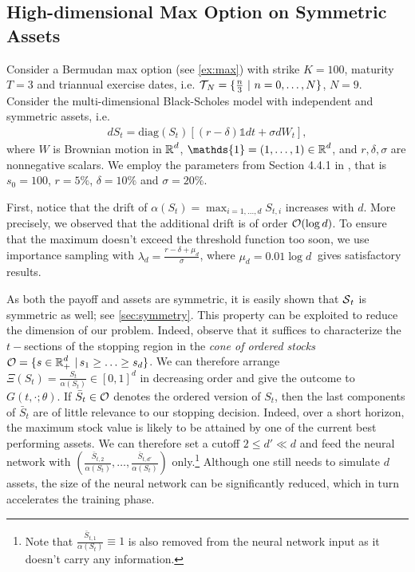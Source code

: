 \subsection{High-dimensional Max Option on Symmetric Assets}\label{sec:maxCallSym}
Consider a Bermudan max option (see \cref{ex:max}) %
with strike $K=100$, maturity $T=3$ and triannual exercise dates, i.e. $\operatorname{\mathcal{T}}_{\! N} = \{\frac{n}{3} \ | \ n=0,\ldots,N\}$, $N=9$.  Consider the multi-dimensional Black-Scholes model with independent and symmetric assets, i.e. 
\begin{align}\label{eq:multiBS}
    d S_t = \text{diag}(S_t) \left[ (r - \delta)\mathds{1} dt + \sigma dW_t\right],
\end{align}
where $W$ is Brownian motion in $\operatorname{\mathbb{R}}^d$, $\mathds{1} = (1,\ldots,1) \in \R^d$, and $r,\delta,\sigma$ are nonnegative scalars. 
We employ the parameters from Section 4.4.1 in \cite{Becker2}, that is $s_0 =100 $, $r=5\%$, $\delta =10\%$ and $\sigma = 20 \%$. 

 First, notice that the drift of $\alpha(S_t) = \max_{i=1,...,d}S_{t,i}$  increases with $d$. More precisely, we observed that the additional drift is of order $\operatorname{\mathcal{O}}(\log d)$. To ensure that the maximum doesn't exceed the threshold function too soon, we use importance sampling with $\lambda_d = \frac{r-\delta + \mu_d}{\sigma}$, where $\mu_d = 0.01 \log d\ $ gives satisfactory results. %

As both the payoff and assets are symmetric, it is easily shown that  $\operatorname{\mathcal{S}}_t$ is symmetric as well; see \cref{sec:symmetry}. This property can be exploited to reduce the dimension of our problem. Indeed, observe that it suffices to characterize the $t-$sections of the stopping region in the \textit{cone of ordered stocks}  
 $\operatorname{\mathcal{O}} = \{s\in \operatorname{\mathbb{R}}_+^d \,|\, s_1 \geq \ldots \geq s_d\}$. We can therefore arrange $\Xi(S_t) = \frac{S_t}{\alpha(S_t)}\in [0,1]^d$ in decreasing order and give the outcome to $G(t,\cdot; \theta)$. If $\bar{S}_t \in \operatorname{\mathcal{O}}$ denotes the ordered version of $S_t$, then the last components of $\bar{S}_t$ are of little relevance to our stopping decision. 
 Indeed, over a short horizon, the maximum stock value is likely to be attained by one of the current best performing assets. %
 We can therefore set a cutoff $2 \le d' \ll d$ and feed the neural network with $(\frac{\bar{S}_{t,2}}{\alpha(S_t)},\ldots,\frac{\bar{S}_{t,d'}}{\alpha(S_t)})$ only.\footnote{Note that $\frac{\bar{S}_{t,1}}{\alpha(S_t)} \equiv 1$ is also removed from the neural network input as it doesn't carry any information.} Although one still needs to simulate $d$ assets, the size of the neural network can be significantly reduced, which in turn accelerates the training phase. 
 
